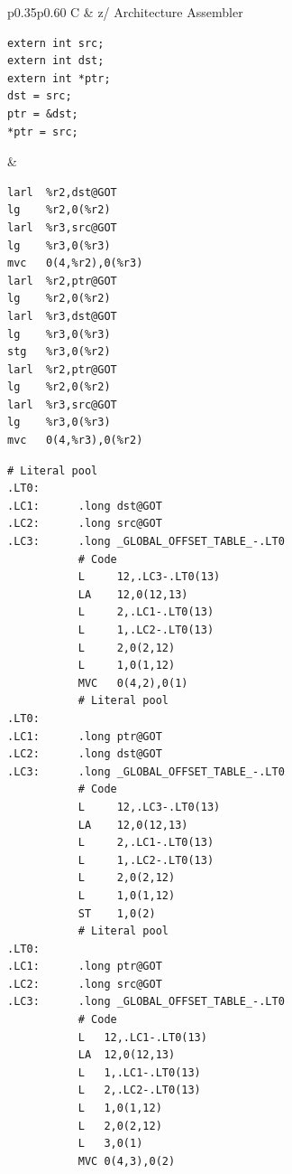 \documentclass[USenglish,fontsize=11pt,twoside,%
  toc=bib,toc=idx,toc=graduated,numbers=noendperiod,
  bookmarks=true,
  bookmarksnumbered=true,
  bookmarksopen=true,
  bookmarksopenlevel=1,
  breaklinks=true,
  colorlinks=true,
  linkcolor=black,
  pdfpagelayout={TwoPageRight},
  pdfusetitle=true
]{scrreprt}
\newcommand{\ARCH}{z/\kern-1pt Ar\-chi\-tec\-ture}
\newcommand{\ARCH}{ESA/390}
\newenvironment{DIFnomarkup}{}{} %
\begin{document}
\begin{table}
  \centering
  \begin{DIFnomarkup}
  \begin{tabular}{p{}p{}}
    \toprule
    C & \ARCH{} Assembler \\
    \midrule
\begin{lstlisting}[style=short]
extern int src;
extern int dst;
extern int *ptr;
dst = src;
ptr = &dst;
*ptr = src;
\end{lstlisting}
    &
\ifzseries
\begin{lstlisting}[style=short,language=simpleasm]
larl  %r2,dst@GOT
lg    %r2,0(%r2)
larl  %r3,src@GOT
lg    %r3,0(%r3)
mvc   0(4,%r2),0(%r3)
larl  %r2,ptr@GOT
lg    %r2,0(%r2)
larl  %r3,dst@GOT
lg    %r3,0(%r3)
stg   %r3,0(%r2)
larl  %r2,ptr@GOT
lg    %r2,0(%r2)
larl  %r3,src@GOT
lg    %r3,0(%r3)
mvc   0(4,%r3),0(%r2)
\end{lstlisting}
\else
\begin{lstlisting}[style=short,language=simpleasm]
           # Literal pool
.LT0:
.LC1:      .long dst@GOT
.LC2:      .long src@GOT
.LC3:      .long _GLOBAL_OFFSET_TABLE_-.LT0
           # Code
           L     12,.LC3-.LT0(13)
           LA    12,0(12,13)
           L     2,.LC1-.LT0(13)
           L     1,.LC2-.LT0(13)
           L     2,0(2,12)
           L     1,0(1,12)
           MVC   0(4,2),0(1)
           # Literal pool
.LT0:
.LC1:      .long ptr@GOT
.LC2:      .long dst@GOT
.LC3:      .long _GLOBAL_OFFSET_TABLE_-.LT0
           # Code
           L     12,.LC3-.LT0(13)
           LA    12,0(12,13)
           L     2,.LC1-.LT0(13)
           L     1,.LC2-.LT0(13)
           L     2,0(2,12)
           L     1,0(1,12)
           ST    1,0(2)
           # Literal pool
.LT0:
.LC1:      .long ptr@GOT
.LC2:      .long src@GOT
.LC3:      .long _GLOBAL_OFFSET_TABLE_-.LT0
           # Code
           L   12,.LC1-.LT0(13)
           LA  12,0(12,13)
           L   1,.LC1-.LT0(13)
           L   2,.LC2-.LT0(13)
           L   1,0(1,12)
           L   2,0(2,12)
           L   3,0(1)
           MVC 0(4,3),0(2)
\end{lstlisting}
\fi \\
    \bottomrule
  \end{tabular}
  \end{DIFnomarkup}
  \caption{Large model position-independent addressing}
  \label{tab:largegot}
\end{table}
\end{document}

